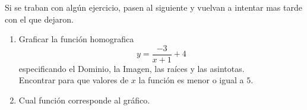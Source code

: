 \documentclass[a4paper,spanish]{exam}
\begin{document}
	Si se traban con algún ejercicio, pasen al siguiente y vuelvan a intentar mas tarde con el que dejaron.
	
	\begin{enumerate}
		
		
		
		\item Graficar la función homografica \[ y=\frac{-3}{x+1}+4 \] especificando el Dominio, la Imagen, las raíces y las asintotas. \\
		
		Encontrar para que valores de $x$ la función es menor o igual a $5$.
		
		
		\item Cual función corresponde al gráfico. 
		

\end{enumerate}
\end{document}
